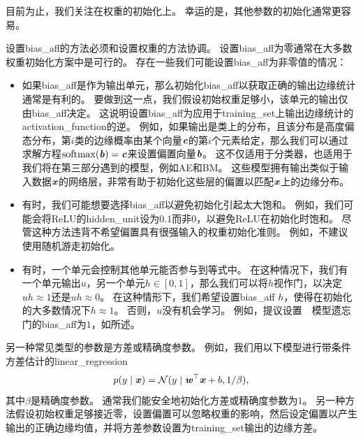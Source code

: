 目前为止，我们关注在权重的初始化上。
幸运的是，其他参数的初始化通常更容易。


设置\gls{bias_aff}的方法必须和设置权重的方法协调。
设置\gls{bias_aff}为零通常在大多数权重初始化方案中是可行的。
存在一些我们可能设置\gls{bias_aff}为非零值的情况：

\begin{itemize}
\item 如果\gls{bias_aff}是作为输出单元，那么初始化\gls{bias_aff}以获取正确的输出边缘统计通常是有利的。
要做到这一点，我们假设初始权重足够小，该单元的输出仅由\gls{bias_aff}决定。
这说明设置\gls{bias_aff}为应用于\gls{training_set}上输出边缘统计的\gls{activation_function}的逆。
例如，如果输出是类上的分布，且该分布是高度偏态分布，第$i$类的边缘概率由某个向量$\boldsymbol{\mathit{c}}$的第$i$个元素给定，那么我们可以通过求解方程$\text{softmax}(\boldsymbol{\mathit{b}})=\boldsymbol{\mathit{c}}$来设置偏置向量$\boldsymbol{\mathit{b}}$。
这不仅适用于分类器，也适用于我们将在第三部分遇到的模型，例如\gls{AE}和\gls{BM}。
这些模型拥有输出类似于输入数据$\boldsymbol{\mathit{x}}$的网络层，非常有助于初始化这些层的偏置以匹配$\boldsymbol{\mathit{x}}$上的边缘分布。


\item 有时，我们可能想要选择\gls{bias_aff}以避免初始化引起太大饱和。
例如，我们可能会将ReLU的\gls{hidden_unit}设为$0.1$而非$0$，以避免ReLU在初始化时饱和。
尽管这种方法违背不希望偏置具有很强输入的权重初始化准则。
例如，不建议使用随机游走初始化\citep{Sussillo14}。


\item 有时，一个单元会控制其他单元能否参与到等式中。
在这种情况下，我们有一个单元输出$u$，另一个单元$h\in[0,1]$，那么我们可以将$h$视作门，以决定$uh\approx 1$还是$uh\approx 0$。
在这种情形下，我们希望设置\gls{bias_aff} $h$，使得在初始化的大多数情况下$h\approx 1$。
否则，$u$没有机会学习。
例如，\cite{Jozefowicz-et-al-ICML2015}提议设置~~模型遗忘门的\gls{bias_aff}为$1$，如所述。
\end{itemize}


另一种常见类型的参数是方差或精确度参数。
例如，我们用以下模型进行带条件方差估计的\gls{linear_regression}
\begin{equation}
    p(y\mid\boldsymbol{\mathit{x}}) = \mathcal{N} (y \mid \boldsymbol{\mathit{w}}^\top \boldsymbol{\mathit{x}} + b, 1/\beta) ,
\end{equation}
其中$\beta$是精确度参数。
通常我们能安全地初始化方差或精确度参数为$1$。
另一种方法假设初始权重足够接近零，设置偏置可以忽略权重的影响，然后设定偏置以产生输出的正确边缘均值，并将方差参数设置为\gls{training_set}输出的边缘方差。


